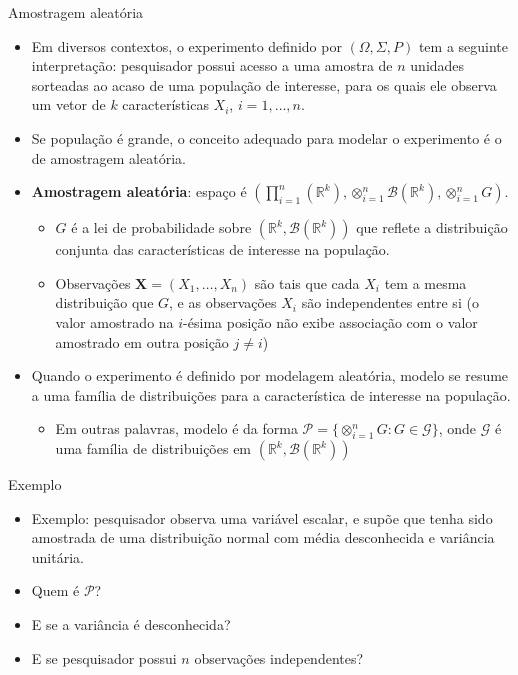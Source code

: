 \documentclass[11pt]{beamer}
\newenvironment{halfwideitemize}{\itemize\addtolength{\itemsep}{0.5em}}{\enditemize}
\begin{document}
	\begin{frame}{Amostragem aleatória}
	\begin{itemize}
		\item Em diversos contextos, o experimento definido por $(\Omega, \Sigma, P)$ tem a seguinte interpretação: pesquisador possui acesso a uma amostra de $n$ unidades sorteadas ao acaso de uma população de interesse, para os quais ele observa um vetor de $k$ características $X_i$, $i=1,\ldots, n$.
		\item Se população é {\color{blue}grande}, o conceito adequado para modelar o experimento é o de {\color{blue}amostragem aleatória}.
		\begin{halfwideitemize}
			\item \textbf{Amostragem aleatória}: espaço é $(\prod_{i=1}^n (\mathbb{R}^k), \otimes_{i=1}^n \mathcal{B}(\mathbb{R}^k), \otimes_{i=1}^n G)$.
			\begin{itemize}
								\item  $G$ é a lei de probabilidade sobre $(\mathbb{R}^k, \mathcal{B}(\mathbb{R}^k))$ que reflete a distribuição conjunta das características de interesse na população.
				\item Observações $\boldsymbol{X} = (X_1,\ldots, X_n)$ são tais que cada $X_i$ tem a mesma distribuição que $G$, e as observações $X_i$ são independentes  entre si (o valor amostrado na $i$-ésima posição não exibe associação com o valor amostrado em outra posição $j\neq i$)
			\end{itemize}
			\item Quando o experimento é definido por modelagem aleatória, modelo se resume a uma família de distribuições para a característica de interesse na população.
			\begin{itemize}
				\item Em outras palavras, modelo é da forma $\mathcal{P} = \{\otimes_{i=1}^n G : G \in \mathcal{G}\}$, onde $\mathcal{G}$ é uma família de distribuições em $(\mathbb{R}^k, \mathcal{B}(\mathbb{R}^k))$
			\end{itemize}

	
		\end{halfwideitemize}
	\end{itemize}
		\end{frame}
		
		\begin{frame}{Exemplo}
		\begin{itemize}
			\item {\color{blue}Exemplo:} pesquisador observa uma variável escalar, e supõe que tenha sido amostrada de uma distribuição normal com média desconhecida e variância unitária.
			\begin{halfwideitemize}
				\item Quem é $\mathcal{P}$?
				\item E se a variância é desconhecida?
				\item E se pesquisador possui $n$ observações independentes?
			\end{halfwideitemize}
		\end{itemize}
	\end{frame}
\end{document}
